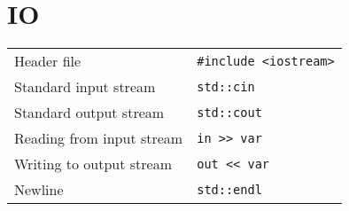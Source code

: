 \section{IO}

\begin{center}
  \begin{tabular}{ll}
    Header file & \verb'#include <iostream>' \\
    Standard input stream & \verb'std::cin' \\
    Standard output stream & \verb'std::cout' \\
    Reading from input stream & \verb'in >> var' \\
    Writing to output stream & \verb'out << var' \\
    Newline & \verb'std::endl' \\
  \end{tabular}
\end{center}

\begin{example}
\end{example}

\begin{example}
\end{example}


